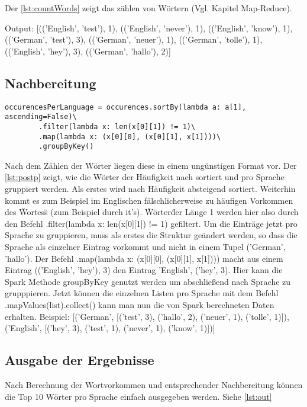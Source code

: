 \documentclass[chapterprefix=true, 12pt, a4paper, oneside, parskip=half, listof=totoc, bibliography=totoc, numbers=noendperiod]{scrbook}
\begin{document}
Der \autoref{lst:countWords} zeigt das zählen von Wörtern (Vgl. Kapitel Map-Reduce). 

Output: 
[(('English', 'test'), 1),
 (('English', 'never'), 1),
 (('English', 'know'), 1),
 (('German', 'test'), 3),
 (('German', 'neuer'), 1),
 (('German', 'tolle'), 1),
 (('English', 'hey'), 3),
 (('German', 'hallo'), 2)]
\subsection{Nachbereitung}
 \begin{lstlisting}[caption={Vorbereitung}, captionpos=b, label={lst:postp}]
occurencesPerLanguage = occurences.sortBy(lambda a: a[1], ascending=False)\
        .filter(lambda x: len(x[0][1]) != 1)\
        .map(lambda x: (x[0][0], (x[0][1], x[1])))\
        .groupByKey()
\end{lstlisting}


Nach dem Zählen der Wörter liegen diese in einem ungünstigen Format vor. Der \autoref{lst:postp} zeigt, wie die Wörter der Häufigkeit nach sortiert und pro Sprache gruppiert werden. Als erstes wird nach Häufigkeit absteigend sortiert. Weiterhin kommt es zum Beispiel im Englischen fälschlicherweise zu häufigen Vorkommen des \"Wortes\" s (zum Beispiel durch it's). \"Wörter\" der Länge 1 werden hier also durch den Befehl  .filter(lambda x: len(x[0][1]) != 1) gefiltert.  Um die Einträge jetzt pro Sprache zu gruppieren, muss als erstes die Struktur geändert werden, so dass die Sprache als einzelner Eintrag vorkommt und nicht in einem Tupel ('German', 'hallo'). Der Befehl .map(lambda x: (x[0][0], (x[0][1], x[1]))) macht aus einem Eintrag (('English', 'hey'), 3) den Eintrag 'English', ('hey', 3). Hier kann die Spark Methode groupByKey genutzt werden um abschließend nach Sprache zu grupppieren. Jetzt können die einzelnen Listen pro Sprache mit dem Befehl .mapValues(list).collect() kann man nun die von Spark berechneten Daten erhalten. 
Beispiel: 
[('German', [('test', 3), ('hallo', 2), ('neuer', 1), ('tolle', 1)]),
 ('English', [('hey', 3), ('test', 1), ('never', 1), ('know', 1)])]
 
\subsection{Ausgabe der Ergebnisse}
Nach Berechnung der Wortvorkommen und entsprechender Nachbereitung können die Top 10 Wörter pro Sprache einfach ausgegeben werden. Siehe \autoref{lst:out}
\end{document}
